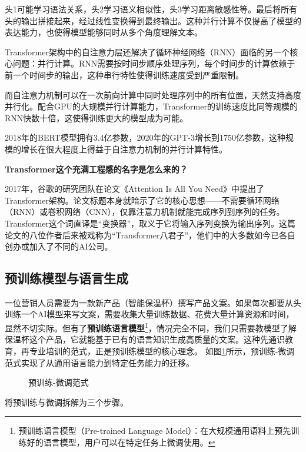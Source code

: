 头1可能学习语法关系，头2学习语义相似性，头3学习距离敏感性等。最后将所有头的输出拼接起来，经过线性变换得到最终输出。这种并行计算不仅提高了模型的表达能力，也使得模型能够同时从多个角度理解文本。

Transformer架构中的自注意力层还解决了循环神经网络（RNN）面临的另一个核心问题：并行计算。RNN需要按时间步顺序处理序列，每个时间步的计算依赖于前一个时间步的输出，这种串行特性使得训练速度受到严重限制。

而自注意力机制可以在一次前向计算中同时处理序列中的所有位置，天然支持高度并行化。配合GPU的大规模并行计算能力，Transformer的训练速度比同等规模的RNN快数十倍，这使得训练更大的模型成为可能。

2018年的BERT模型拥有3.4亿参数，2020年的GPT-3增长到1750亿参数，这种规模的增长在很大程度上得益于自注意力机制的并行计算特性。

\begin{knowledgebox}
\small
\textbf{Transformer这个充满工程感的名字是怎么来的？}

2017年，谷歌的研究团队在论文《Attention Is All You Need》中提出了Transformer架构。论文标题本身就暗示了它的核心思想——不需要循环网络（RNN）或卷积网络（CNN），仅靠注意力机制就能完成序列到序列的任务。Transformer这个词直译是“变换器”，取义于它将输入序列变换为输出序列。这篇论文的八位作者后来被戏称为“Transformer八君子”，他们中的大多数如今已各自创办或加入了不同的AI公司。
\end{knowledgebox}



\subsection{预训练模型与语言生成}
一位营销人员需要为一款新产品（智能保温杯）撰写产品文案。如果每次都要从头训练一个AI模型来写文案，需要收集大量训练数据、花费大量计算资源和时间，显然不切实际。但有了\textbf{预训练语言模型}\footnote{预训练语言模型（Pre-trained Language Model）：在大规模通用语料上预先训练好的语言模型，用户可以在特定任务上微调使用。}，情况完全不同，我们只需要教模型了解保温杯这个产品，它就能基于已有的语言知识生成高质量的文案。这种先通识教育，再专业培训的范式，正是预训练模型的核心理念。
如图\ref{fig:ch2_2_25}所示，预训练-微调范式实现了从通用语言能力到特定任务能力的迁移。

\begin{figure}[H]
\centering
{}
\caption{预训练-微调范式}
\label{fig:ch2_2_25}
\end{figure}


将预训练与微调拆解为三个步骤。

